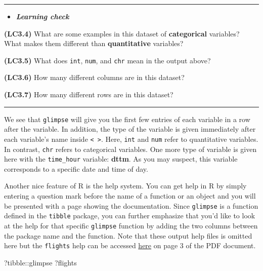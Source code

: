 \documentclass[]{tufte-book}
\newenvironment{Shaded}{\begin{snugshade}}{\end{snugshade}}
\newcommand{\NormalTok}[1]{{#1}}
\let\oldrule=\rule
\renewcommand{\rule}[1]{\oldrule{\linewidth}}
\newenvironment{rmdblock}[1]
  {\begin{shaded*}
  \begin{itemize}
  \renewcommand{\labelitemi}{
    \raisebox{-.7\height}[0pt][0pt]{
    }
  }
  \item
  }
  {
  \end{itemize}
  \end{shaded*}
  }
\newenvironment{learncheck}
  {\begin{rmdblock}{warning}}
  {\end{rmdblock}}
\begin{document}
\begin{center}\rule{0.5\linewidth}{\linethickness}\end{center}

\begin{learncheck}
\textbf{\emph{Learning check}}
\end{learncheck}

\textbf{(LC3.4)} What are some examples in this dataset of
\textbf{categorical} variables? What makes them different than
\textbf{quantitative} variables?

\textbf{(LC3.5)} What does \texttt{int}, \texttt{num}, and \texttt{chr}
mean in the output above?

\textbf{(LC3.6)} How many different columns are in this dataset?

\textbf{(LC3.7)} How many different rows are in this dataset?

\begin{center}\rule{0.5\linewidth}{\linethickness}\end{center}

We see that \texttt{glimpse} will give you the first few entries of each
variable in a row after the variable. In addition, the type of the
variable is given immediately after each variable's name inside
\texttt{\textless{}\ \textgreater{}}. Here, \texttt{int} and
\texttt{num} refer to quantitative variables. In contrast, \texttt{chr}
refers to categorical variables. One more type of variable is given here
with the \texttt{time\_hour} variable: \textbf{dttm}. As you may
suspect, this variable corresponds to a specific date and time of day.

Another nice feature of R is the help system. You can get help in R by
simply entering a question mark before the name of a function or an
object and you will be presented with a page showing the documentation.
Since \texttt{glimpse} is a function defined in the \texttt{tibble}
package, you can further emphasize that you'd like to look at the help
for that specific \texttt{glimpse} function by adding the two columns
between the package name and the function. Note that these output help
files is omitted here but the \texttt{flights} help can be accessed
\href{https://cran.r-project.org/web/packages/nycflights13/nycflights13.pdf}{here}
on page 3 of the PDF document.

\begin{Shaded}
\begin{Highlighting}[]
\NormalTok{?tibble::glimpse}
\NormalTok{?flights}
\end{Highlighting}
\end{Shaded}
\end{document}
